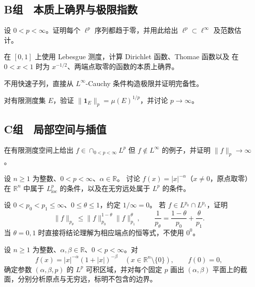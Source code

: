\subsection*{B组　本质上确界与极限指数}
\begin{enumerate}[label=\textbf{\thechapter.\arabic*.},resume]
设 \(0<p<\infty\)。证明每个 \(\ell^p\) 序列都趋于零，并用此给出
\(\ell^p\subset\ell^\infty\) 及范数估计。

在 \([0,1]\) 上使用 Lebesgue 测度，计算 Dirichlet 函数、Thomae 函数以及
在 \(0<x<1\) 时为 \(x^{-1/2}\)、两端点取零的函数的本质上确界。

不用快速子列，直接从 \(L^\infty\)-Cauchy 条件构造极限并证明完备性。

对有限测度集 \(E\)，验证
\(\|\mathbf1_E\|_p=\mu(E)^{1/p}\)，并讨论 \(p\to\infty\)。

\end{enumerate}
\subsection*{C组　局部空间与插值}
\begin{enumerate}[label=\textbf{\thechapter.\arabic*.},resume]
在有限测度空间上给出 \(f\in\cap_{0<p<\infty}L^p\) 但
\(f\notin L^\infty\) 的例子，并证明 \(\|f\|_p\to\infty\)。

设 \(n\ge1\) 为整数、\(0<p<\infty\)、\(\alpha\in\mathbb R\)。
讨论 \(f(x)=|x|^{-\alpha}\)（\(x\ne0\)，原点取零）在 \(\mathbb R^n\) 中属于
\(L^p_{\mathrm{loc}}\) 的条件，以及在无穷远处属于 \(L^p\) 的条件。

设 \(0<p_0<p_1\le\infty\)、\(0\le\theta\le1\)，约定 \(1/\infty=0\)。
若 \(f\in L^{p_0}\cap L^{p_1}\)，证明
\[
 \|f\|_{p_\theta}
 \le\|f\|_{p_0}^{1-\theta}\|f\|_{p_1}^{\theta},
 \qquad
 \frac1{p_\theta}=\frac{1-\theta}{p_0}+\frac{\theta}{p_1}.
\]
当 \(\theta=0,1\) 时直接将结论理解为相应端点的恒等式，不使用 \(0^0\)。

设 \(n\ge1\) 为整数、\(\alpha,\beta\in\mathbb R\)、\(0<p<\infty\)。对
\[
 f(x)=|x|^{-\alpha}(1+|x|)^{-\beta}
\quad(x\in\mathbb R^n\setminus\{0\}),\qquad f(0)=0,
\]
确定参数 \((\alpha,\beta,p)\) 的 \(L^p\) 可积区域，并对每个固定 \(p\)
画出 \((\alpha,\beta)\) 平面上的截面，分别分析原点与无穷远，标明不包含的边界。
\end{enumerate}
